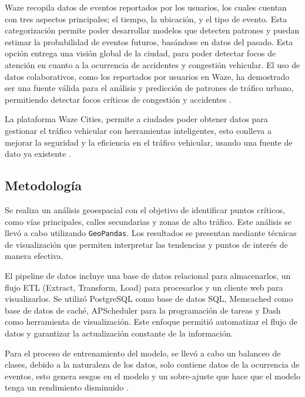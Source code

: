 \documentclass[12pt]{article}
\begin{document}
Waze recopila datos de eventos reportados por los usuarios, los cuales cuentan con tres aspectos principales; el tiempo, la ubicación, y el tipo de evento. Esta categorización permite poder desarrollar modelos que detecten patrones y puedan estimar la probabilidad de eventos futuros, basándose en datos del pasado. Esta opción entrega una visión global de la ciudad, para poder detectar focos de atención en cuanto a la ocurrencia de accidentes y congestión vehicular. El uso de datos colaborativos, como los reportados por usuarios en Waze, ha demostrado ser una fuente válida para el análisis y predicción de patrones de tráfico urbano, permitiendo detectar focos críticos de congestión y accidentes \parencite{ferreira2017waze}.

La plataforma Waze Cities, permite a ciudades poder obtener datos para gestionar el tráfico vehicular con herramientas inteligentes, esto conlleva a mejorar la seguridad y la eficiencia en el tráfico vehicular, usando una fuente de dato ya existente \parencite{wazecitiescasestudies2024}.

\subsection{Metodología}

Se realiza un análisis geoespacial con el objetivo de identificar puntos críticos, como vías principales, calles secundarias y zonas de alto tráfico. Este análisis se llevó a cabo utilizando \texttt{GeoPandas}. Los resultados se presentan mediante técnicas de visualización que permiten interpretar las tendencias y puntos de interés de manera efectiva.

El pipeline de datos incluye una base de datos relacional para almacenarlos, un flujo ETL (Extract, Transform, Load) para procesarlos y un cliente web para visualizarlos. Se utilizó PostgreSQL \parencite{postgres2025} como base de datos SQL, Memcached  \parencite{memcached2025} como base de datos de caché, APScheduler para la programación de tareas y Dash \parencite{dash2025} como herramienta de visualización. Este enfoque permitió automatizar el flujo de datos y garantizar la actualización constante de la información.

Para el proceso de entrenamiento del modelo, se llevó a cabo un balanceo de clases, debido a la naturaleza de los datos, solo contiene datos de la ocurrencia de eventos, esto genera sesgos en el modelo y un sobre-ajuste que hace que el modelo tenga un rendimiento disminuido \parencite{he2009learning}.
\end{document}
